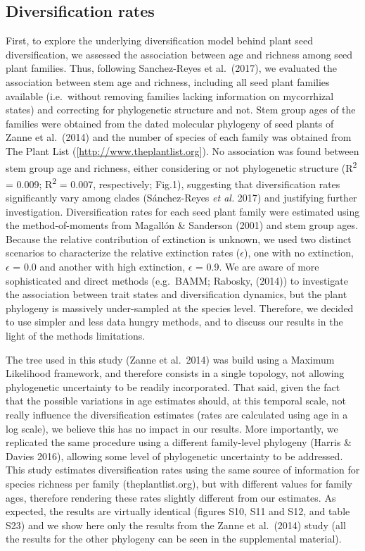 \documentclass[12pt,]{article}
\begin{document}
\hypertarget{diversification-rates}{%
\subsection{Diversification rates}\label{diversification-rates}}

First, to explore the underlying diversification model behind plant seed
diversification, we assessed the association between age and richness
among seed plant families. Thus, following Sanchez-Reyes et al.~(2017),
we evaluated the association between stem age and richness, including
all seed plant families available (i.e.~without removing families
lacking information on mycorrhizal states) and correcting for
phylogenetic structure and not. Stem group ages of the families were
obtained from the dated molecular phylogeny of seed plants of Zanne et
al.~(2014) and the number of species of each family was obtained from
The Plant List ({[}\url{http://www.theplantlist.org}{]}). No association
was found between stem group age and richness, either considering or not
phylogenetic structure (R\textsuperscript{2} = 0.009;
R\textsuperscript{2} = 0.007, respectively; Fig.1), suggesting that
diversification rates significantly vary among clades (Sánchez-Reyes
\emph{et al.} 2017) and justifying further investigation.
Diversification rates for each seed plant family were estimated using
the method-of-moments from Magallón \& Sanderson (2001) and stem group
ages. Because the relative contribution of extinction is unknown, we
used two distinct scenarios to characterize the relative extinction
rates (\(\epsilon\)), one with no extinction, \(\epsilon\) = 0.0 and
another with high extinction, \(\epsilon\) = 0.9. We are aware of more
sophisticated and direct methods (e.g.~BAMM; Rabosky, (2014)) to
investigate the association between trait states and diversification
dynamics, but the plant phylogeny is massively under-sampled at the
species level. Therefore, we decided to use simpler and less data hungry
methods, and to discuss our results in the light of the methods
limitations.

The tree used in this study (Zanne et al.~2014) was build using a
Maximum Likelihood framework, and therefore consists in a single
topology, not allowing phylogenetic uncertainty to be readily
incorporated. That said, given the fact that the possible variations in
age estimates should, at this temporal scale, not really influence the
diversification estimates (rates are calculated using age in a log
scale), we believe this has no impact in our results. More importantly,
we replicated the same procedure using a different family-level
phylogeny (Harris \& Davies 2016), allowing some level of phylogenetic
uncertainty to be addressed. This study estimates diversification rates
using the same source of information for species richness per family
(theplantlist.org), but with different values for family ages, therefore
rendering these rates slightly different from our estimates. As
expected, the results are virtually identical (figures S10, S11 and S12,
and table S23) and we show here only the results from the Zanne et
al.~(2014) study (all the results for the other phylogeny can be seen in
the supplemental material).
\end{document}
